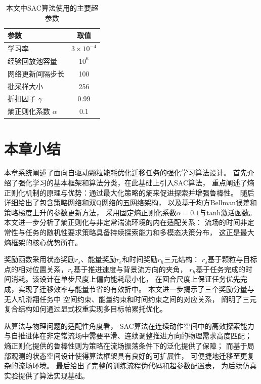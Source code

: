 \begin{table}[!h]
    \caption{本文中SAC算法使用的主要超参数}
    \label{tab:hyperparams}
    \centering
    \begin{tabular}{l|c}
        \hline
        参数 & 取值 \\ \hline
        学习率 & $3 \times 10^{-4}$ \\
        经验回放池容量 & $10^6$ \\
        网络更新间隔步长 & 100 \\
        批采样大小 & 256 \\
        折扣因子 $\gamma$ & 0.99 \\
        熵正则化系数 $\alpha$ & 0.1 \\
        \hline
    \end{tabular}
\end{table}

\section{本章小结}

本章系统阐述了面向自驱动颗粒能耗优化迁移任务的强化学习算法设计。
首先介绍了强化学习的基本框架和算法分类，在此基础上引入SAC算法，
重点阐述了熵正则化机制的原理与优势：通过最大化策略的熵来促进探索并增强鲁棒性。
随后详细给出了包含策略网络和双Q网络的五网络架构，
以及基于均方Bellman误差和策略梯度上升的参数更新方法，
采用固定熵正则化系数$\alpha = 0.1$与tanh激活函数。
本文进一步分析了熵正则化与非定常湍流环境的内在适配关系：
流场的时间非定常性与任务的随机性要求策略具备持续探索能力和多模态决策分布，
这正是最大熵框架的核心优势所在。

奖励函数采用状态奖励$r_s$、能量奖励$r_e$和时间奖励$r_h$三元结构：
$r_s$基于颗粒与目标点的相对位置关系，$r_e$基于推进速度与背景流方向的夹角，
$r_h$基于任务完成的时间消耗。该设计在单步尺度上偏向能耗最小化，
在回合尺度上保证任务优先完成，实现了迁移效率与能量节省的有效折中。
本文进一步揭示了三个奖励分量与无人机滑翔任务中
空间约束、能量约束和时间约束之间的对应关系，
阐明了三元复合结构如何通过显式权重实现多目标帕累托优化。

从算法与物理问题的适配性角度看，
SAC算法在连续动作空间中的高效探索能力
与自推进体在非定常流场中需要平滑、连续调整推进方向的物理需求高度匹配；
熵正则化提供的鲁棒性则为策略在流场振荡条件下的泛化提供了保障；
而基于局部观测的状态空间设计使得算法框架具有良好的可扩展性，
可便捷地迁移至更复杂的流场环境。
最后给出了完整的训练流程伪代码和超参数配置表，
为后续仿真实验提供了算法实现基础。



